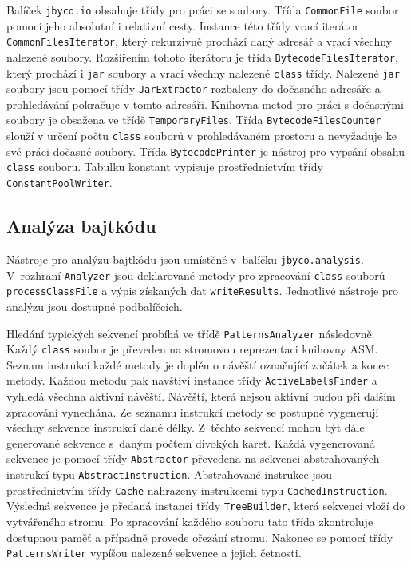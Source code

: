 Balíček \texttt{jbyco.io} obsahuje třídy pro práci se soubory. Třída \texttt{CommonFile} soubor pomocí jeho absolutní i relativní cesty. Instance této třídy vrací iterátor \texttt{CommonFilesIterator}, který rekurzivně prochází daný adresář a vrací všechny nalezené soubory. Rozšířením tohoto iterátoru je třída \texttt{BytecodeFilesIterator}, který prochází i \texttt{jar} soubory a vrací všechny nalezené \texttt{class} třídy. Nalezené \texttt{jar} soubory jsou pomocí třídy \texttt{JarExtractor} rozbaleny do dočasného adresáře a prohledávání pokračuje v tomto adresáři. Knihovna metod pro práci s dočasnými soubory je obsažena ve třídě \texttt{TemporaryFiles}. Třída \texttt{BytecodeFilesCounter} slouží v určení počtu \texttt{class} souborů v prohledávaném prostoru a nevyžaduje ke své práci dočasné soubory. 
Třída \texttt{BytecodePrinter} je nástroj pro vypsání obsahu \texttt{class} souboru. Tabulku konstant vypisuje prostřednictvím třídy \texttt{ConstantPoolWriter}.  

\subsection{Analýza bajtkódu}

Nástroje pro analýzu bajtkódu jsou umístěné v~balíčku \texttt{jbyco.analysis}. V~rozhraní \texttt{Analyzer} jsou deklarované metody pro zpracování \texttt{class} souborů \texttt{processClassFile} a výpis získaných dat \texttt{writeResults}. Jednotlivé nástroje pro analýzu jsou dostupné podbalíčcích.

Hledání typických sekvencí probíhá ve třídě \texttt{PatternsAnalyzer} následovně. Každý \texttt{class} soubor je převeden na stromovou reprezentaci knihovny ASM. Seznam instrukcí každé metody je doplěn o návěští označující začátek a konec metody. Každou metodu pak navštíví instance třídy \texttt{ActiveLabelsFinder} a vyhledá všechna aktivní návěští. Návěští, která nejsou aktivní budou při dalším zpracování vynechána. Ze seznamu instrukcí metody se postupně vygenerují všechny sekvence instrukcí dané délky. Z~těchto sekvencí mohou být dále generované sekvence s~daným počtem divokých karet. Každá vygenerovaná sekvence je pomocí třídy \texttt{Abstractor} převedena na sekvenci abstrahovaných instrukcí typu \texttt{AbstractInstruction}. Abstrahované instrukce jsou prostřednictvím třídy \texttt{Cache} nahrazeny instrukcemi typu \texttt{CachedInstruction}. Výsledná sekvence je předaná instanci třídy \texttt{TreeBuilder}, která sekvenci vloží do vytvářeného stromu. Po zpracování každého souboru tato třída zkontroluje dostupnou paměť a případně provede ořezání stromu. Nakonec se pomocí třídy \texttt{PatternsWriter} vypíšou nalezené sekvence a jejich četnosti.

